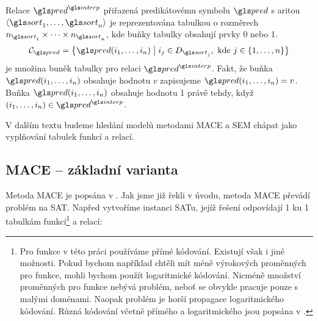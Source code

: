 Relace $\pred^\interp$
přiřazená predikátovému symbolu $\pred$ s aritou
$\langle \sort_1 \comdots \sort_n \rangle$
je reprezentována tabulkou o rozměrech $n_{\sort_1} \timdots n_{\sort_n}$,
kde buňky tabulky obsahují prvky 0 nebo 1.
\[
\cells_\pred = \bigl\{ \pred(i_1 \comdots i_n) \bigm| i_j \in D_{\sort_j},
  \text{ kde } j \in \{ 1 \comdots n  \}  \bigr\}
\]
je množina buněk tabulky pro relaci $\pred^\interp$.
Fakt, že buňka $\pred(i_1 \comdots i_n)$ obsahuje hodnotu $v$
zapisujeme $\pred(i_1 \comdots i_n) = v$.
Buňka $\pred(i_1 \comdots i_n)$ obsahuje hodnotu 1
právě tehdy, když $(i_1 \comdots i_n) \in \pred^\interp$.


V dalším textu budeme hledání modelů metodami MACE a SEM chápat jako
vyplňování tabulek funkcí a relací.

\subsection{MACE -- základní varianta}

Metoda MACE je popsána v \cite{mccune94davis-putnam}.
Jak jsme již řekli v úvodu, metoda MACE převádí problém na SAT.
Napřed vytvoříme instanci SATu, jejíž řešení odpovídají 1 ku 1
tabulkám funkcí\footnote{Pro funkce v této práci používáme přímé kódování.
Existují však i jiné možnosti.
Pokud bychom například chtěli mít méně
výrokových proměnných pro funkce, mohli bychom použít logaritmické kódování.
Nicméně množství proměnných pro funkce nebývá problém,
neboť se obvykle pracuje pouze s malými doménami.
Naopak problém je horší propagace logaritmického kódování.
Různá kódování včetně přímého a logaritmického jsou popsána
v \cite{gavanelli2007}.} a relací:


